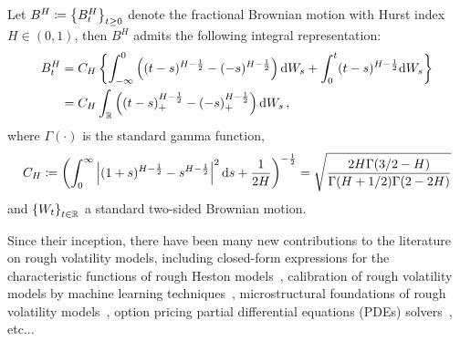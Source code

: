 \begin{definition}
Let $B^H\coloneqq\left\{B_t^H\right\}_{t \geq 0}$ denote the fractional Brownian motion with Hurst index $H \in(0,1)$, then $B^H$ admits the following integral representation:
\begin{align*}
B_t^H &= C_H\left\{\int_{-\infty}^0\left((t-s)^{H-\frac{1}{2}}-(-s)^{H-\frac{1}{2}}\right) \mathrm{d} W_s+\int_0^t(t-s)^{H-\frac{1}{2}} \mathrm{d} W_s\right\} \\
&= C_H \int_{\mathbb{R}}\left((t-s)_{+}^{H-\frac{1}{2}}-(-s)_{+}^{H-\frac{1}{2}}\right) \mathrm{d} W_s\,,
\end{align*}
where $\Gamma(\cdot)$ is the standard gamma function,
\[
C_H\coloneqq\left(\int_0^{\infty}\left\lvert(1+s)^{H-\frac{1}{2}}-s^{H-\frac{1}{2}}\right\rvert^2 \mathrm{d} s+\frac{1}{2 H}\right)^{-\frac{1}{2}}=\sqrt{\frac{2 H \Gamma(3 / 2-H)}{\Gamma(H+1 / 2) \Gamma(2-2 H)}}
\]
and $\left\{W_t\right\}_{t \in \mathbb{R}}$ a standard two-sided Brownian motion.
\end{definition}
Since their inception, there have been many new contributions to the literature on rough volatility models, including closed-form expressions for the characteristic functions of rough Heston models~\cite{Euch2018TheModels}, calibration of rough volatility models by machine learning techniques~\cite{Horvath2020DeepModels}, microstructural foundations of rough volatility models~\cite{Euch2018TheVolatility}, option pricing partial differential equations (PDEs) solvers~\cite{Jacquier2023DeepVolatility, Bayer2022PricingSPDEs}, etc...



